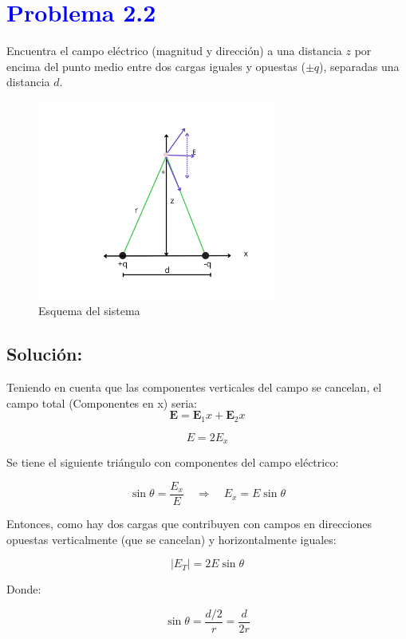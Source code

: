 \documentclass[12pt]{article}
\newcommand{\question}[1]{\textcolor{blue}{\textbf{#1}}}
\begin{document}


\section*{\question{Problema 2.2} }Encuentra el campo eléctrico (magnitud y dirección) a una distancia \( z \) por encima del punto medio entre dos cargas iguales y opuestas (\( \pm q \)), separadas una distancia \( d \).

\begin{figure}[ht] 
    \centering
    \includegraphics[width=0.7\textwidth]{imagenes/eje2.2 (1).jpg}
    \caption{Esquema del sistema}
    \label{Esquema1}
\end{figure}

\subsection*{Solución:}
Teniendo en cuenta que las componentes verticales del campo se cancelan, el campo total (Componentes en x) seria: 
\[
\mathbf{E} = \mathbf{E}_1x + \mathbf{E}_2x  
\]

\[
{E} = 2{E}_x
\]

Se tiene el siguiente triángulo con componentes del campo eléctrico:

\[
\sin \theta = \frac{E_x}{E} \quad \Rightarrow \quad E_x = E \sin \theta
\]

Entonces, como hay dos cargas que contribuyen con campos en direcciones opuestas verticalmente (que se cancelan) y horizontalmente iguales:

\[
|E_T| = 2E \sin \theta
\]

Donde:

\[
\sin \theta = \frac{d/2}{r} = \frac{d}{2r}
\]
\end{document}
